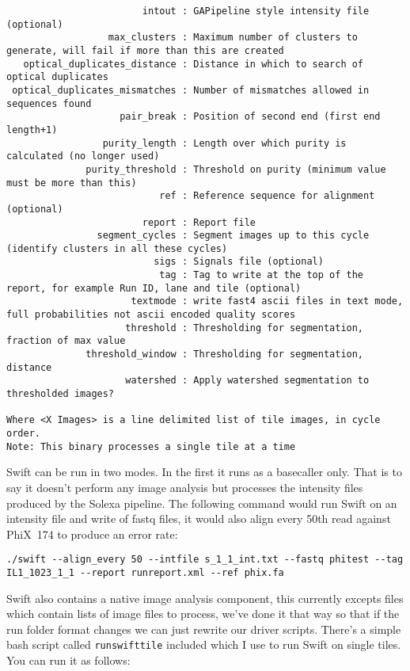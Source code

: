 \documentclass{report}
\begin{document}
\begin{verbatim}
                        intout : GAPipeline style intensity file (optional)
                  max_clusters : Maximum number of clusters to generate, will fail if more than this are created
   optical_duplicates_distance : Distance in which to search of optical duplicates
 optical_duplicates_mismatches : Number of mismatches allowed in sequences found
                    pair_break : Position of second end (first end length+1)
                 purity_length : Length over which purity is calculated (no longer used)
              purity_threshold : Threshold on purity (minimum value must be more than this)
                           ref : Reference sequence for alignment (optional)
                        report : Report file
                segment_cycles : Segment images up to this cycle (identify clusters in all these cycles)
                          sigs : Signals file (optional)
                           tag : Tag to write at the top of the report, for example Run ID, lane and tile (optional)
                      textmode : write fast4 ascii files in text mode, full probabilities not ascii encoded quality scores
                     threshold : Thresholding for segmentation, fraction of max value
              threshold_window : Thresholding for segmentation, distance
                     watershed : Apply watershed segmentation to thresholded images?

Where <X Images> is a line delimited list of tile images, in cycle order.
Note: This binary processes a single tile at a time
\end{verbatim}

Swift can be run in two modes. In the first it runs as a basecaller only. That is to say it doesn't perform any image analysis but processes the intensity files produced by the Solexa pipeline. The following command would run Swift on an intensity file and write of fastq files, it would also align every 50th read against PhiX~174 to produce an error rate:

\begin{verbatim}
./swift --align_every 50 --intfile s_1_1_int.txt --fastq phitest --tag IL1_1023_1_1 --report runreport.xml --ref phix.fa
\end{verbatim}


Swift also contains a native image analysis component, this currently excepts files which contain lists of image files to process, we've done it that way so that if the run folder format changes we can just rewrite our driver scripts. There's a simple bash script called \texttt{runswifttile} included which I use to run Swift on single tiles. You can run it as follows:
\end{document}
